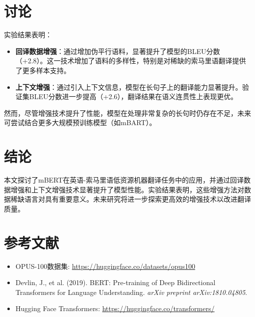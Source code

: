 \documentclass[a4paper,12pt]{article}
\begin{document}
\section{讨论}
实验结果表明：
\begin{itemize}
    \item \textbf{回译数据增强}：通过增加伪平行语料，显著提升了模型的BLEU分数（+2.8）。这一技术增加了语料的多样性，特别是对稀缺的索马里语翻译提供了更多样本支持。
    \item \textbf{上下文增强}：通过引入上下文信息，模型在长句子上的翻译能力显著提升。验证集BLEU分数进一步提高（+2.6），翻译结果在语义连贯性上表现更优。
\end{itemize}
然而，尽管增强技术提升了性能，模型在处理非常复杂的长句时仍存在不足，未来可尝试结合更多大规模预训练模型（如mBART）。

\section{结论}
本文探讨了mBERT在英语-索马里语低资源机器翻译任务中的应用，并通过回译数据增强和上下文增强技术显著提升了模型性能。实验结果表明，这些增强方法对数据稀缺语言对具有重要意义。未来研究将进一步探索更高效的增强技术以改进翻译质量。

\section*{参考文献}
\begin{itemize}
    \item OPUS-100数据集: \url{https://huggingface.co/datasets/opus100}
    \item Devlin, J., et al. (2019). BERT: Pre-training of Deep Bidirectional Transformers for Language Understanding. \textit{arXiv preprint arXiv:1810.04805}.
    \item Hugging Face Transformers: \url{https://huggingface.co/transformers/}
\end{itemize}
\end{document}
